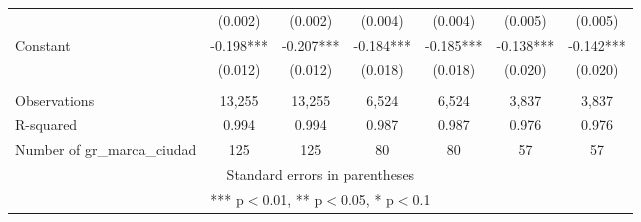 \begin{tabular}{lcccccc}
 & (0.002) & (0.002) & (0.004) & (0.004) & (0.005) & (0.005) \\
Constant & -0.198*** & -0.207*** & -0.184*** & -0.185*** & -0.138*** & -0.142*** \\
 & (0.012) & (0.012) & (0.018) & (0.018) & (0.020) & (0.020) \\
 &  &  &  &  &  &  \\
Observations & 13,255 & 13,255 & 6,524 & 6,524 & 3,837 & 3,837 \\
R-squared & 0.994 & 0.994 & 0.987 & 0.987 & 0.976 & 0.976 \\
 Number of gr\_marca\_ciudad & 125 & 125 & 80 & 80 & 57 & 57 \\ \hline
\multicolumn{7}{c}{ Standard errors in parentheses} \\
\multicolumn{7}{c}{ *** p$<$0.01, ** p$<$0.05, * p$<$0.1} \\
\end{tabular}
